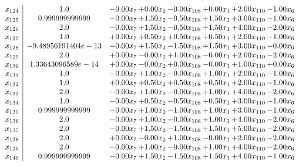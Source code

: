 \documentclass[8pt]{article}
\begin{document}
\[\begin{array}{c| c c@{\hskip 2pt} c@{\hskip 2pt} c@{\hskip 2pt} c@{\hskip 2pt} c@{\hskip 2pt} c@{\hskip 2pt} }
 x_{124}   &  1.0 & -0.00 x_{7} & +  0.00 x_{2} & -0.00 x_{108} & +  0.00 x_{1} & +  2.00 x_{110} & -1.00 x_{6}\\
 x_{125}   &  0.999999999999 & -0.00 x_{7} & +  1.50 x_{2} & -0.50 x_{108} & +  1.50 x_{1} & +  3.00 x_{110} & -1.00 x_{6}\\
 x_{126}   &  2.0 & -0.00 x_{7} & +  1.50 x_{2} & -0.50 x_{108} & +  1.50 x_{1} & +  4.00 x_{110} & -2.00 x_{6}\\
 x_{127}   &  1.0 & +  0.00 x_{7} & +  0.50 x_{2} & +  0.50 x_{108} & +  0.50 x_{1} & +  2.00 x_{110} & -1.00 x_{6}\\
 x_{128}   &  -9.48956191404e-13 & -0.00 x_{7} & +  1.50 x_{2} & -1.50 x_{108} & +  1.50 x_{1} & +  3.00 x_{110} & -0.00 x_{6}\\
 x_{129}   &  2.0 & +  0.00 x_{7} & -0.00 x_{2} & +  1.00 x_{108} & -0.00 x_{1} & +  2.00 x_{110} & -2.00 x_{6}\\
 x_{130}   &  1.33643096589e-14 & +  0.00 x_{7} & -0.00 x_{2} & +  0.00 x_{108} & -0.00 x_{1} & +  1.00 x_{110} & +  0.00 x_{6}\\
 x_{131}   &  1.0 & -0.00 x_{7} & +  1.00 x_{2} & -0.00 x_{108} & +  1.00 x_{1} & +  2.00 x_{110} & -1.00 x_{6}\\
 x_{132}   &  1.0 & +  0.00 x_{7} & +  0.50 x_{2} & +  0.50 x_{108} & +  0.50 x_{1} & +  2.00 x_{110} & -1.00 x_{6}\\
 x_{133}   &  2.0 & -0.00 x_{7} & +  1.00 x_{2} & -0.00 x_{108} & +  1.00 x_{1} & +  4.00 x_{110} & -2.00 x_{6}\\
 x_{134}   &  1.0 & -0.00 x_{7} & +  0.50 x_{2} & -0.50 x_{108} & +  0.50 x_{1} & +  3.00 x_{110} & -1.00 x_{6}\\
 x_{135}   &  0.999999999999 & -0.00 x_{7} & +  1.00 x_{2} & -1.00 x_{108} & +  1.00 x_{1} & +  3.00 x_{110} & -1.00 x_{6}\\
 x_{136}   &  2.0 & -0.00 x_{7} & +  1.00 x_{2} & -0.00 x_{108} & +  1.00 x_{1} & +  4.00 x_{110} & -2.00 x_{6}\\
 x_{137}   &  2.0 & -0.00 x_{7} & +  1.50 x_{2} & -1.50 x_{108} & +  1.50 x_{1} & +  5.00 x_{110} & -2.00 x_{6}\\
 x_{138}   &  2.0 & +  0.00 x_{7} & -0.00 x_{2} & +  1.00 x_{108} & -0.00 x_{1} & +  2.00 x_{110} & -2.00 x_{6}\\
 x_{139}   &  2.0 & -0.00 x_{7} & +  1.00 x_{2} & -0.00 x_{108} & +  1.00 x_{1} & +  4.00 x_{110} & -2.00 x_{6}\\
 x_{140}   &  0.999999999999 & -0.00 x_{7} & +  1.50 x_{2} & -1.50 x_{108} & +  1.50 x_{1} & +  4.00 x_{110} & -1.00 x_{6}\\

\end{array}\]
\end{document}

